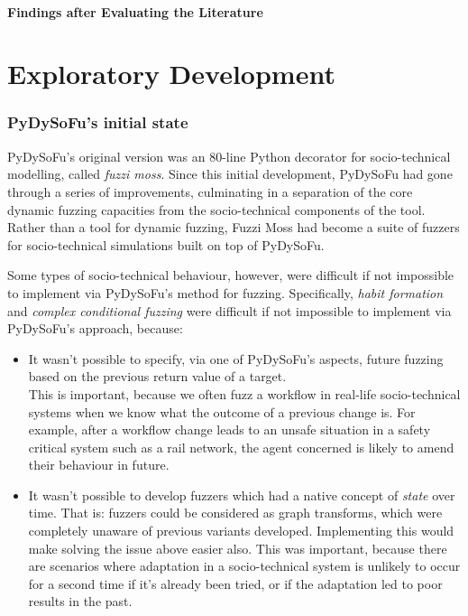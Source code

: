 \documentclass[draft]{article}
\begin{document}
\subsection{Findings after Evaluating the Literature}


\part{Exploratory Development}
\section{PyDySoFu's initial state}
\label{sec:pydysofu}
PyDySoFu's original version was an 80-line Python decorator for socio-technical
modelling, called \emph{fuzzi moss}\cite{4th_year_dissertation}. Since this
initial development, PyDySoFu had gone through a series of improvements,
culminating in a separation of the core dynamic fuzzing capacities from the
socio-technical components of the tool. Rather than a tool for dynamic fuzzing,
Fuzzi Moss had become a suite of fuzzers for socio-technical simulations built
on top of PyDySoFu.\par


Some types of socio-technical behaviour, however, were difficult if not
impossible to implement via PyDySoFu's method for fuzzing. Specifically,
\emph{habit formation} and \emph{complex conditional fuzzing} were difficult if
not impossible to implement via PyDySoFu's approach, because:

\begin{itemize}
\item It wasn't possible to specify, via one of PyDySoFu's aspects, future
  fuzzing based on the previous return value of a target.\\
  This is important, because we often fuzz a workflow in real-life
  socio-technical systems when we know what the outcome of a previous change is.
  For example, after a workflow change leads to an unsafe situation in a safety
  critical system such as a rail network, the agent concerned is likely to amend
  their behaviour in future.
\item It wasn't possible to develop fuzzers which had a native concept of
  \emph{state} over time. That is: fuzzers could be considered as graph
  transforms, which were completely unaware of previous variants developed.
  Implementing this would make solving the issue above easier also. This was
  important, because there are scenarios where adaptation in a socio-technical
  system is unlikely to occur for a second time if it's already been tried, or
  if the adaptation led to poor results in the past.
\end{itemize}
\end{document}
